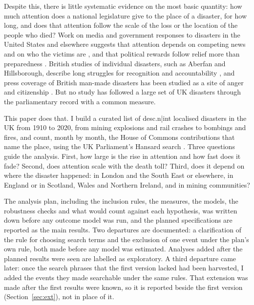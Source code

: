 \documentclass[11pt,a4paper]{article}
\begin{document}
Despite this, there is little systematic evidence on the most basic quantity: how much attention does a national legislature give to the place of a disaster, for how long, and does that attention follow the scale of the loss or the location of the people who died? Work on media and government responses to disasters in the United States and elsewhere suggests that attention depends on competing news and on who the victims are \citep{EisenseeStromberg2007,Stromberg2007}, and that political rewards follow relief more than preparedness \citep{HealyMalhotra2009,GarrettSobel2003}. British studies of individual disasters, such as Aberfan and Hillsborough, describe long struggles for recognition and accountability \citep{McLeanJohnes2000,Johnes2000,Scraton1999}, and press coverage of British man-made disasters has been studied as a site of anger and citizenship \citep{PanttiWahlJorgensen2011}. But no study has followed a large set of UK disasters through the parliamentary record with a common measure.

This paper does that. I build a curated list of {{desc.n|int}} localised disasters in the UK from 1910 to 2020, from mining explosions and rail crashes to bombings and fires, and count, month by month, the House of Commons contributions that name the place, using the UK Parliament's Hansard search \citep{Hansard2026}. Three questions guide the analysis. First, how large is the rise in attention and how fast does it fade? Second, does attention scale with the death toll? Third, does it depend on where the disaster happened: in London and the South East or elsewhere, in England or in Scotland, Wales and Northern Ireland, and in mining communities?

The analysis plan, including the inclusion rules, the measures, the models, the robustness checks and what would count against each hypothesis, was written down before any outcome model was run, and the planned specifications are reported as the main results. Two departures are documented: a clarification of the rule for choosing search terms and the exclusion of one event under the plan's own rule, both made before any model was estimated. Analyses added after the planned results were seen are labelled as exploratory. A third departure came later: once the search phrases that the first version lacked had been harvested, I added the events they made searchable under the same rules. That extension was made after the first results were known, so it is reported beside the first version (Section~\ref{sec:ext}), not in place of it.
\end{document}
